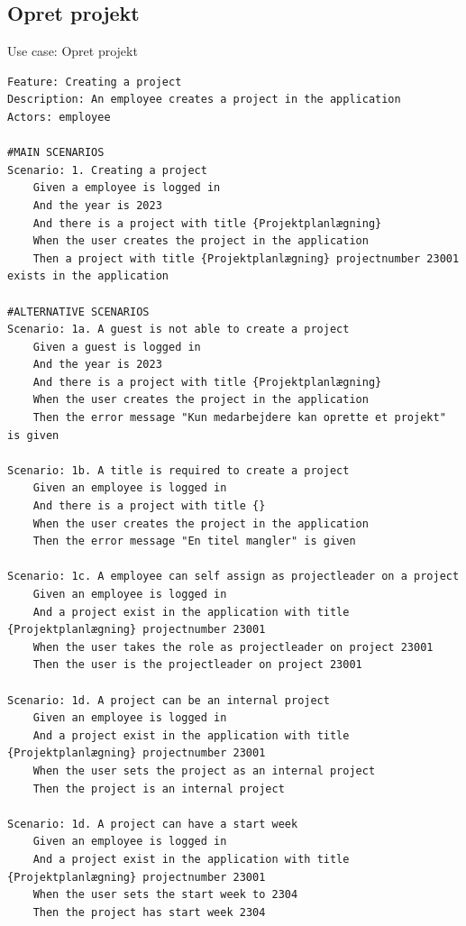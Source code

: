 \subsection{Opret projekt} 
\begin{listing}[H]
    \centering
    \caption{Use case: Opret projekt}\label{lst:usecase_create_project}
    \begin{verbatim}  
Feature: Creating a project
Description: An employee creates a project in the application
Actors: employee

#MAIN SCENARIOS
Scenario: 1. Creating a project
    Given a employee is logged in
    And the year is 2023
    And there is a project with title {Projektplanlægning} 
    When the user creates the project in the application 
    Then a project with title {Projektplanlægning} projectnumber 23001 exists in the application

#ALTERNATIVE SCENARIOS
Scenario: 1a. A guest is not able to create a project
    Given a guest is logged in
    And the year is 2023
    And there is a project with title {Projektplanlægning}  
    When the user creates the project in the application 
    Then the error message "Kun medarbejdere kan oprette et projekt" is given

Scenario: 1b. A title is required to create a project
    Given an employee is logged in
    And there is a project with title {}  
    When the user creates the project in the application 
    Then the error message "En titel mangler" is given

Scenario: 1c. A employee can self assign as projectleader on a project
    Given an employee is logged in
    And a project exist in the application with title {Projektplanlægning} projectnumber 23001
    When the user takes the role as projectleader on project 23001
    Then the user is the projectleader on project 23001

Scenario: 1d. A project can be an internal project
    Given an employee is logged in
    And a project exist in the application with title {Projektplanlægning} projectnumber 23001
    When the user sets the project as an internal project
    Then the project is an internal project

Scenario: 1d. A project can have a start week
    Given an employee is logged in
    And a project exist in the application with title {Projektplanlægning} projectnumber 23001
    When the user sets the start week to 2304
    Then the project has start week 2304
    
    \end{verbatim}
\end{listing}


